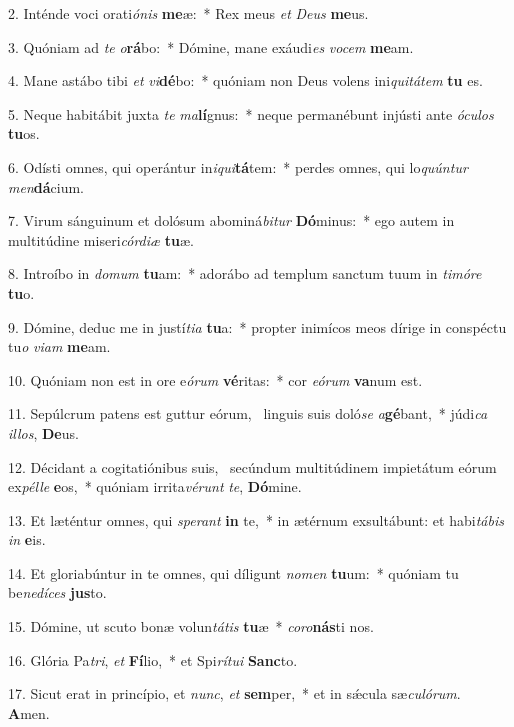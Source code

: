 2. Inténde voci orati\textit{ó}\textit{nis} \textbf{me}æ:~*  Rex meus \textit{et} \textit{De}\textit{us} \textbf{me}us.\

3. Quóniam ad \textit{te} \textit{o}\textbf{rá}bo:~*  Dómine, mane exáudi\textit{es} \textit{vo}\textit{cem} \textbf{me}am.\

4. Mane astábo tibi \textit{et} \textit{vi}\textbf{dé}bo:~*  quóniam non Deus volens ini\textit{qui}\textit{tá}\textit{tem} \textbf{tu} es.\

5. Neque habitábit juxta \textit{te} \textit{ma}\textbf{lí}gnus:~*  neque permanébunt injústi ante \textit{ó}\textit{cu}\textit{los} \textbf{tu}os.\

6. Odísti omnes, qui operántur in\textit{i}\textit{qui}\textbf{tá}tem:~*  perdes omnes, qui lo\textit{quún}\textit{tur} \textit{men}\textbf{dá}cium.\

7. Virum sánguinum et dolósum abominá\textit{bi}\textit{tur} \textbf{Dó}minus:~*  ego autem in multitúdine miseri\textit{cór}\textit{di}\textit{æ} \textbf{tu}æ.\

8. Introíbo in \textit{do}\textit{mum} \textbf{tu}am:~*  adorábo ad templum sanctum tuum in \textit{ti}\textit{mó}\textit{re} \textbf{tu}o.\

9. Dómine, deduc me in justí\textit{ti}\textit{a} \textbf{tu}a:~*  propter inimícos meos dírige in conspéctu tu\textit{o} \textit{vi}\textit{am} \textbf{me}am.\

10. Quóniam non est in ore e\textit{ó}\textit{rum} \textbf{vé}ritas:~*  cor \textit{e}\textit{ó}\textit{rum} \textbf{va}num est.\

11. Sepúlcrum patens est guttur eórum, \dag\  linguis suis doló\textit{se} \textit{a}\textbf{gé}bant,~*  júdi\textit{ca} \textit{il}\textit{los}, \textbf{De}us.\

12. Décidant a cogitatiónibus suis, \dag\  secúndum multitúdinem impietátum eórum ex\textit{pél}\textit{le} \textbf{e}os,~*  quóniam irrita\textit{vé}\textit{runt} \textit{te}, \textbf{Dó}mine.\

13. Et læténtur omnes, qui \textit{spe}\textit{rant} \textbf{in} te,~*  in ætérnum exsultábunt: et habi\textit{tá}\textit{bis} \textit{in} \textbf{e}is.\

14. Et gloriabúntur in te omnes, qui díligunt \textit{no}\textit{men} \textbf{tu}um:~*  quóniam tu be\textit{ne}\textit{dí}\textit{ces} \textbf{jus}to.\

15. Dómine, ut scuto bonæ volun\textit{tá}\textit{tis} \textbf{tu}æ~*  \textit{co}\textit{ro}\textbf{nás}ti nos.\

16. Glória Pa\textit{tri}, \textit{et} \textbf{Fí}lio,~*  et Spi\textit{rí}\textit{tu}\textit{i} \textbf{Sanc}to.\

17. Sicut erat in princípio, et \textit{nunc}, \textit{et} \textbf{sem}per,~*  et in sǽcula sæ\textit{cu}\textit{ló}\textit{rum}. \textbf{A}men.\

